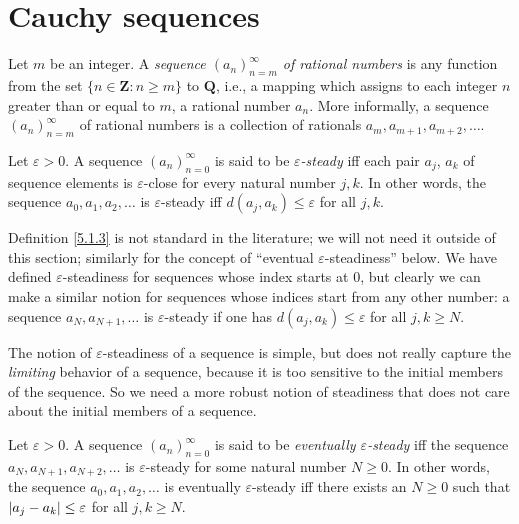 \section{Cauchy sequences}\label{sec 5.1}

\begin{definition}[Sequences]\label{5.1.1}
    Let \(m\) be an integer.
    A \emph{sequence \((a_n)_{n = m}^{\infty}\) of rational numbers} is any function from the set \(\{n \in \mathbf{Z} : n \geq m\}\) to \(\mathbf{Q}\), i.e., a mapping which assigns to each integer \(n\) greater than or equal to \(m\), a rational number \(a_n\).
    More informally, a sequence \((a_n)_{n = m}^{\infty}\) of rational numbers is a collection of rationals \(a_m, a_{m + 1}, a_{m + 2}, \dots\).
\end{definition}

\setcounter{theorem}{2}
\begin{definition}\label{5.1.3}
    Let \(\varepsilon > 0\).
    A sequence \((a_n)_{n = 0}^{\infty}\) is said to be \emph{\(\varepsilon\)-steady} iff each pair \(a_j\), \(a_k\) of sequence elements is \(\varepsilon\)-close for every natural number \(j, k\).
    In other words, the sequence \(a_0, a_1, a_2, \dots\) is \(\varepsilon\)-steady iff \(d(a_j, a_k) \leq \varepsilon\) for all \(j, k\).
\end{definition}

\begin{remark}\label{5.1.4}
    Definition \ref{5.1.3} is not standard in the literature;
    we will not need it outside of this section;
    similarly for the concept of ``eventual \(\varepsilon\)-steadiness'' below.
    We have defined \(\varepsilon\)-steadiness for sequences whose index starts at \(0\), but clearly we can make a similar notion for sequences whose indices start from any other number:
    a sequence \(a_N, a_{N + 1}, \dots\) is \(\varepsilon\)-steady if one has \(d(a_j, a_k) \leq \varepsilon\) for all \(j, k \geq N\).
\end{remark}

\begin{note}
    The notion of \(\varepsilon\)-steadiness of a sequence is simple, but does not really capture the \emph{limiting} behavior of a sequence, because it is too sensitive to the initial members of the sequence.
    So we need a more robust notion of steadiness that does not care about the initial members of a sequence.
\end{note}

\setcounter{theorem}{5}
\begin{definition}\label{5.1.6}
    Let \(\varepsilon > 0\).
    A sequence \((a_n)_{n = 0}^{\infty}\) is said to be \emph{eventually \(\varepsilon\)-steady} iff the sequence \(a_N, a_{N + 1}, a_{N + 2}, \dots\) is \(\varepsilon\)-steady for some natural number \(N \geq 0\).
    In other words, the sequence \(a_0, a_1, a_2, \dots\) is eventually \(\varepsilon\)-steady iff there exists an \(N \geq 0\) such that \(\abs*{a_j - a_k} \leq \varepsilon\) for all \(j, k \geq N\).
\end{definition}

